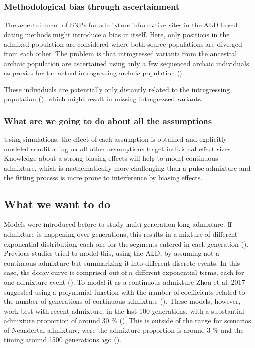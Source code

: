 \documentclass[]{article}
\begin{document}
\subsubsection{Methodological bias through
ascertainment}\label{methodological-bias-through-ascertainment}

The ascertainment of SNPs for admixture informative sites in the ALD
based dating methods might introduce a bias in itself. Here, only
positions in the admixed population are considered where both source
populations are diverged from each other. The problem is that
introgressed variants from the ancestral archaic population are
ascertained using only a few sequenced archaic individuals as proxies
for the actual introgressing archaic population
(\cite{sankararaman_date_2012,fu_genome_2014,sankararaman_combined_2016,moorjani_genetic_2016}).

These individuals are potentially only distantly related to the
introgressing population (\cite{jacobs_multiple_2019}), which might
result in missing introgressed variants.

\subsubsection{What are we going to do about all the
assumptions}\label{what-are-we-going-to-do-about-all-the-assumptions}

Using simulations, the effect of each assumption is obtained and
explicitly modeled conditioning on all other assumptions to get
individual effect sizes. Knowledge about a strong biasing effects will
help to model continuous admixture, which is mathematically more
challenging than a pulse admixture and the fitting process is more prone
to interference by biasing effects.

\subsection{What we want to do}\label{what-we-want-to-do}

Models were introduced before to study multi-generation long admixture.
If admixture is happening over generations, this results in a mixture of
different exponential distribution, each one for the segments entered in
each generation (\cite{pickrell_ancient_2014}). Previous studies tried
to model this, using the ALD, by assuming not a continuous admixture but
summarizing it into different discrete events. In this case, the decay
curve is comprised out of \(n\) different exponential terms, each for
one admixture event (\cite{pickrell_ancient_2014,zhou_inference_2017}).
To model it as a continuous admixture Zhou et al. 2017 suggested using a
polynomial function with the number of coefficients related to the
number of generations of continuous admixture
(\cite{zhou_modeling_2017}). These models, however, work best with recent
admixture, in the last 100 generations, with a substantial admixture
proportion of around 30 \% (\cite{zhou_modeling_2017}). This is outside
of the range for scenarios of Neandertal admixture, were the admixture
proportion is around 3 \% and the timing around 1500 generations ago
(\cite{sankararaman_date_2012,prufer_complete_2013,sankararaman_genomic_2014}).
\end{document}
